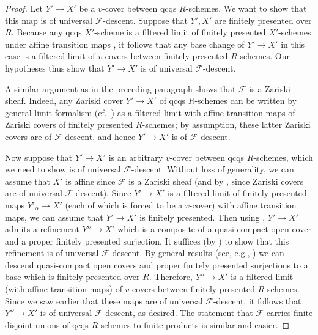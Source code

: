 \documentclass[reqno]{amsart}
\newcommand{\sF}{\mathcal{F}}
\theoremstyle{definition}
\begin{document}
\begin{proof} 
Let $Y' \to X'$ be a $v$-cover between qcqs $R$-schemes. 
We want to show that this map is of universal $\mathcal{F}$-descent. 
Suppose that $Y', X'$ are finitely presented over $R$. Because any qcqs $X'$-scheme is a filtered
limit of finitely presented $X'$-schemes under affine transition maps \cite[Tag
09MU]{stacks-project}, it follows that  any base change of $Y'
\to X'$ in this case is a filtered limit of $v$-covers between finitely
presented $R$-schemes. 
Our hypotheses thus show that $Y' \to X'$ is of universal $\mathcal{F}$-descent. 

A similar argument as in the preceding 
paragraph shows that $\sF$ is a Zariski sheaf. 
Indeed, any Zariski cover $Y' \to X'$ of qcqs $R$-schemes can be written by
general limit formalism (cf.~\cite[Tag 01YT]{stacks-project}) as a
filtered limit with affine transition maps of Zariski covers of finitely
presented $R$-schemes; by assumption, these latter Zariski covers are of
$\sF$-descent, and hence $Y' \to X'$ is of $\sF$-descent. 

Now suppose that $Y' \to X'$ is an arbitrary $v$-cover between qcqs
$R$-schemes, which we need to show is of universal $\sF$-descent. 
Without loss of generality, we can assume that $X'$ is affine since $\sF$ is
a Zariski sheaf (and by , since Zariski covers are of universal
$\sF$-descent). 
Since $Y' \to X'$ is a filtered limit of finitely presented maps $Y'_\alpha \to
X'$ (each of which is forced to be a $v$-cover) with affine transition maps, we
can assume that $Y' \to X'$ is finitely presented. Then using \cite[Th.~3.12]{Rydh}, $Y' \to X'$ admits a refinement $Y'' \to X'$ which is a composite of a
quasi-compact open cover and a proper finitely presented surjection. It suffices
(by ) to show that this refinement is of universal $\mathcal{F}$-descent. 
By general results (see, e.g., \cite[Tag 01YT]{stacks-project}) we can 
descend quasi-compact open covers and proper finitely presented surjections to a
base
which is finitely presented 
over $R$. Therefore, $ Y'' \to X' $ is a filtered limit (with affine transition
maps) of $v$-covers between finitely presented $R$-schemes. Since we saw earlier
that these maps are of universal $\mathcal{F}$-descent, it follows that $Y'' \to X'$ is
of universal $\mathcal{F}$-descent, as desired. The statement that
$\mathcal{F}$ carries finite disjoint unions of qcqs $R$-schemes to 
finite products is similar and easier. 
\end{proof} 
\end{document}
